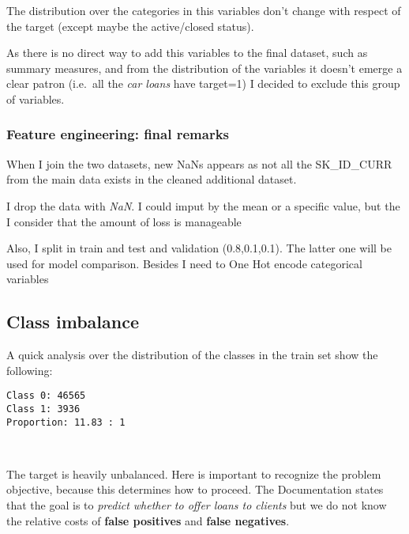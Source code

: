 \documentclass[11pt]{article}
\begin{document}
The distribution over the categories in this variables don't change with respect of the target (except maybe the active/closed status).

As there is no direct way to add this variables to the final dataset, such as summary measures, and from the distribution of the variables it doesn't emerge a clear patron (i.e.~all the \emph{car loans} have target=1) I decided to exclude this group of variables.


 \subsubsection{Feature engineering: final remarks}
 
When I join the two datasets, new NaNs appears as not all the SK\_ID\_CURR from the main data exists in the cleaned additional dataset.

I drop the data with \textit{NaN}. I could imput by the mean or a specific value,
but the I consider that the amount of loss is manageable

Also, I split in train and test and validation (0.8,0.1,0.1). The latter one will be used for model comparison. Besides I need to One Hot encode categorical variables


    \hypertarget{target-balance}{%
\subsection{Class imbalance}\label{target-balance}}

A quick analysis over the distribution of the classes in the train set show the following: 

    \begin{Verbatim}[commandchars=\\\{\}]
Class 0: 46565
Class 1: 3936
Proportion: 11.83 : 1

    \end{Verbatim}

    \begin{center}
    \end{center}
    { \hspace*{\fill} \\}
 
The target is heavily unbalanced. Here is important to recognize the problem objective, because this determines how to proceed. 
The Documentation states that the goal is to \textit{predict whether to offer loans to clients} but we do not know the relative costs of \textbf{false positives} and \textbf{false negatives}.
\end{document}
